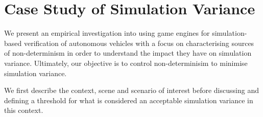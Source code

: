 \documentclass[letterpaper, 10 pt, journal, twoside]{IEEEtran}
\begin{document}
%
%


\section{Case Study of Simulation Variance} \label{s:case-study}

We present an empirical investigation into using game engines for
simulation-based verification of autonomous vehicles with a focus on
characterising sources of non-determinism in order to understand  the impact
they have on simulation variance. 
%
Ultimately, our objective is to control non-determinisim to minimise simulation variance.

We first describe the context, scene and scenario of interest before discussing and defining a threshold for what is considered an acceptable simulation variance in this context.
%

\end{document}
